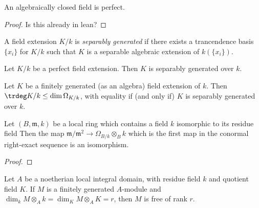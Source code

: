 \begin{lemma}
  \label{lem:alg_clsd_is_perf}
  An algebraically closed field is perfect.
\end{lemma}

\begin{proof}
  Is this already in lean?
\end{proof}

\begin{definition}
  \label{def:sep_gen}
  A field extension $K/k$ is 
  \textit{separably generated}
  if there exists a trancendence basis
  $\{x_i\}$
  for $K/k$ such that
  $K$ is a separable algebraic extension
  of $k(\{x_i\})$.
\end{definition}

\begin{lemma}
  \label{lem:perf_is_sep_gen}
  Let $K/k$ be a perfect field extension.
  Then $K$ is separably generated over $k$.
\end{lemma}

\begin{lemma}
  [Hartshorne II.8.6A]
  \label{lem:kahler_diff_field_extension}
  Let $K$ be a finitely generated (as an algebra)
  field extension of $k$.
  Then $\trdeg K/k \leq \dim \Omega_{K/k}$,
  with equality 
  if (and only if) $K$ is separably
  generated over $k$.
\end{lemma}

\begin{theorem}
	[Hartshorne II.8.7]
	\label{thm:local_conormal_isom_kahler_tensor_residue}
	Let \((B,\mathfrak{m},k)\) be a local ring 
	which contains a field \(k\) 
	isomorphic to its residue field
	Then the map 
	\(\mathfrak{m} / \mathfrak{m}^{2} \to \Omega_{B / k} \otimes_{B} k\)
	which is the first map in the 
	conormal right-exact sequence
	is an isomorphism.
\end{theorem}

\begin{proof}
\end{proof}

\begin{lemma}
  [Hartshorne II.8.9]
  \label{lem:local_special_and_general_same_dim_implies_free}
  Let $A$ be a noetherian local integral domain,
  with residue field $k$ and 
  quotient field $K$.
  If $M$ is a finitely generated $A$-module
  and 
  $\dim_k M \otimes_A k = \dim_K M \otimes_A K = r$,
  then $M$ is free of rank $r$.
\end{lemma}

